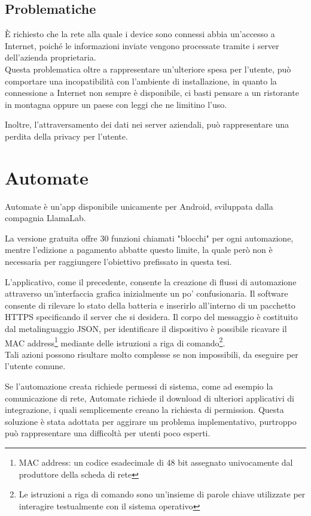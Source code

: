 \documentclass[target=bach]{thud}
\begin{document}
    \subsection{Problematiche}

    \`E richiesto che la rete alla quale i device sono connessi abbia un'accesso a Internet, poiché le informazioni inviate vengono processate tramite i server dell'azienda proprietaria.\\
    Questa problematica oltre a rappresentare un'ulteriore spesa per l'utente, può comportare una incopatibilità con l'ambiente di installazione, in quanto la connessione a Internet non sempre è disponibile, ci basti pensare a un ristorante in montagna oppure un paese con leggi che ne limitino l'uso.

    Inoltre, l'attraversamento dei dati nei server aziendali, può rappresentare una perdita della privacy per l'utente.


    \section{Automate}

    Automate è un'app disponibile unicamente per Android, sviluppata dalla compagnia LlamaLab.

    La versione gratuita offre 30 funzioni chiamati "blocchi" per ogni automazione, mentre l'edizione a pagamento abbatte questo limite, la quale però non è necessaria per raggiungere l'obiettivo prefissato in questa tesi.

    L'applicativo, come il precedente, consente la creazione di flussi di automazione attraverso un'interfaccia grafica inizialmente un po' confusionaria. Il software consente di rilevare lo stato della batteria e inserirlo all'interno di un pacchetto HTTPS specificando il server che si desidera.
    Il corpo del messaggio è costituito dal metalinguaggio JSON, per identificare il dispositivo è possibile ricavare il MAC address\footnote[1]{MAC address: un codice esadecimale di 48 bit assegnato univocamente dal produttore della scheda di rete} mediante delle istruzioni a riga di comando\footnote[2]{Le istruzioni a riga di comando sono un'insieme di parole chiave utilizzate per interagire testualmente con il sistema operativo}. \\
    Tali azioni possono risultare molto complesse se non impossibili, da eseguire per l'utente comune.

    Se l'automazione creata richiede permessi di sistema, come ad esempio la comunicazione di rete, Automate richiede il download di ulteriori applicativi di integrazione, i quali semplicemente creano la richiesta di permission. Questa soluzione è stata adottata per aggirare un problema implementativo, purtroppo può rappresentare una difficoltà per utenti poco esperti.
\end{document}
